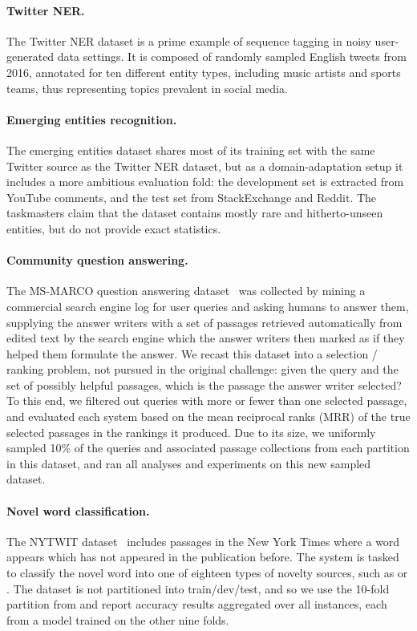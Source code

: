 \paragraph{Twitter NER.}
The Twitter NER dataset \cite{strauss-etal-2016-results} is a prime example of sequence tagging in noisy user-generated data settings.
It is composed of randomly sampled English tweets from 2016, annotated for ten different entity types, including music artists and sports teams, thus representing topics prevalent in social media.

\paragraph{Emerging entities recognition.}
The emerging entities dataset \cite{derczynski-etal-2017-results} shares most of its training set with the same Twitter source as the Twitter NER dataset, but as a domain-adaptation setup it includes a more ambitious evaluation fold: the development set is extracted from YouTube comments, and the test set from StackExchange and Reddit.
The taskmasters claim that the dataset contains mostly rare and hitherto-unseen entities, but do not provide exact statistics.

\paragraph{Community question answering.}
The MS-MARCO question answering dataset~\cite[\marco;][]{nguyen2016ms} was collected by mining a commercial search engine log for user queries and asking humans to answer them, supplying the answer writers with a set of passages retrieved automatically from edited text by the search engine which the answer writers then marked as  if they helped them formulate the answer.
We recast this dataset into a selection / ranking problem, not pursued in the original challenge: given the query and the set of possibly helpful passages, which is the passage the answer writer selected?
To this end, we filtered out queries with more or fewer than one selected passage, and evaluated each system based on the mean reciprocal ranks (MRR) of the true selected passages in the rankings it produced.
Due to its size, we uniformly sampled 10\% of the queries and associated passage collections from each partition in this dataset, and ran all analyses and experiments on this new sampled dataset.

\paragraph{Novel word classification.}
The NYTWIT dataset~\cite{pinter-etal-2020-nytwit} includes passages in the New York Times where a word appears which has not appeared in the publication before.
The system is tasked to classify the novel word into one of eighteen types of novelty sources, such as  or .
The dataset is not partitioned into train/dev/test, and so we use the 10-fold partition from  and report accuracy results aggregated over all instances, each from a model trained on the other nine folds.


